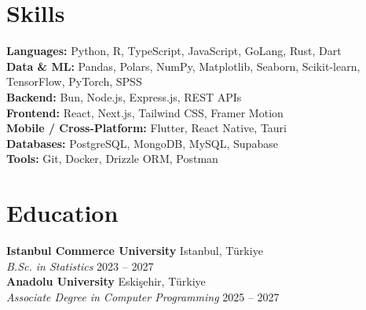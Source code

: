 \documentclass[10pt,a4paper]{extarticle}
\begin{document}
\section{Skills}
\textbf{Languages:} Python, R, TypeScript, JavaScript, GoLang, Rust, Dart \\
\textbf{Data \& ML:} Pandas, Polars, NumPy, Matplotlib, Seaborn, Scikit-learn, TensorFlow, PyTorch, SPSS \\
\textbf{Backend:} Bun, Node.js, Express.js, REST APIs \\
\textbf{Frontend:} React, Next.js, Tailwind CSS, Framer Motion \\
\textbf{Mobile / Cross-Platform:} Flutter, React Native, Tauri \\
\textbf{Databases:} PostgreSQL, MongoDB, MySQL, Supabase \\
\textbf{Tools:} Git, Docker, Drizzle ORM, Postman
\section{Education}
\textbf{Istanbul Commerce University} \hfill Istanbul, Türkiye\\
\textit{B.Sc. in Statistics} \hfill 2023 -- 2027\\
\textbf{Anadolu University} \hfill Eskişehir, Türkiye\\
\textit{Associate Degree in Computer Programming} \hfill 2025 -- 2027\\
\end{document}
